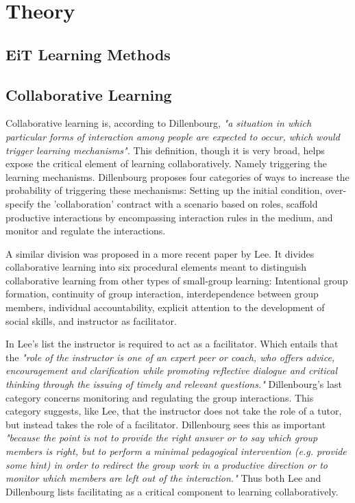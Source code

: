 \chapter{Theory}
 
    \section{EiT Learning Methods}
    
    \section{Collaborative Learning}
    
        Collaborative learning is, according to Dillenbourg, \emph{"a situation in which particular forms of interaction among people are expected to occur, which would trigger learning mechanisms".} \cite{dillenbourg1999} This definition, though it is very broad, helps expose the critical element of learning collaboratively. Namely triggering the learning mechanisms. Dillenbourg proposes four categories of ways to increase the probability of triggering these mechanisms: Setting up the initial condition, over-specify the 'collaboration' contract with a scenario based on roles, scaffold productive interactions by encompassing interaction rules in the medium, and monitor and regulate the interactions. \cite{dillenbourg1999}
        
        A similar division was proposed in a more recent paper by Lee. It divides collaborative learning into six procedural elements meant to distinguish collaborative learning from other types of small-group learning: Intentional group formation, continuity of group interaction, interdependence between group members, individual accountability, explicit attention to the development of social skills, and instructor as facilitator. \cite{Lee2009}
        
        In Lee's list the instructor is required to act as a facilitator. Which entails that the \emph{"role of the instructor is one of an expert peer or coach, who offers advice, encouragement and clarification while promoting reflective dialogue and critical thinking through the issuing of timely and relevant questions."} \cite{Lee2009} Dillenbourg's last category concerns monitoring and regulating the group interactions. This category suggests, like Lee, that the instructor does not take the role of a tutor, but instead takes the role of a facilitator. Dillenbourg sees this as important \emph{"because the point is not to provide the right answer or to say which group members is right, but to perform a minimal pedagogical intervention (e.g. provide some hint) in order to redirect the group work in a productive direction or to monitor which members are left out of the interaction."} \cite{dillenbourg1999} Thus both Lee and Dillenbourg lists facilitating as a critical component to learning collaboratively.
        
